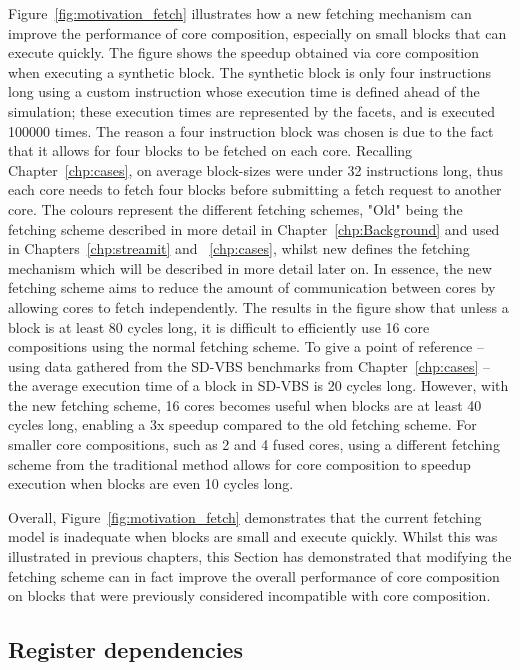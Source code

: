 Figure~\ref{fig:motivation_fetch} illustrates how a new fetching mechanism can improve the performance of core composition, especially on small blocks that can execute quickly.
The figure shows the speedup obtained via core composition when executing a synthetic block.
The synthetic block is only four instructions long using a custom instruction whose execution time is defined ahead of the simulation; these execution times are represented by the facets, and is executed 100000 times.
The reason a four instruction block was chosen is due to the fact that it allows for four blocks to be fetched on each core.
Recalling Chapter~\ref{chp:cases}, on average block-sizes were under 32 instructions long, thus each core needs to fetch four blocks before submitting a fetch request to another core.
The colours represent the different fetching schemes, "Old" being the fetching scheme described in more detail in Chapter~\ref{chp:Background} and used in Chapters~\ref{chp:streamit} and ~\ref{chp:cases}, whilst new defines the fetching mechanism which will be described in more detail later on.
In essence, the new fetching scheme aims to reduce the amount of communication between cores by allowing cores to fetch independently.
The results in the figure show that unless a block is at least 80 cycles long, it is difficult to efficiently use 16 core compositions using the normal fetching scheme.
To give a point of reference -- using data gathered from the SD-VBS benchmarks from Chapter~\ref{chp:cases} -- the average execution time of a block in SD-VBS is 20 cycles long.
However, with the new fetching scheme, 16 cores becomes useful when blocks are at least 40 cycles long, enabling a 3x speedup compared to the old fetching scheme.
For smaller core compositions, such as 2 and 4 fused cores, using a different fetching scheme from the traditional method allows for core composition to speedup execution when blocks are even 10 cycles long.

Overall, Figure~\ref{fig:motivation_fetch} demonstrates that the current fetching model is inadequate when blocks are small and execute quickly.
Whilst this was illustrated in previous chapters, this Section has demonstrated that modifying the fetching scheme can in fact improve the overall performance of core composition on blocks that were previously considered incompatible with core composition.

\subsection{Register dependencies}

